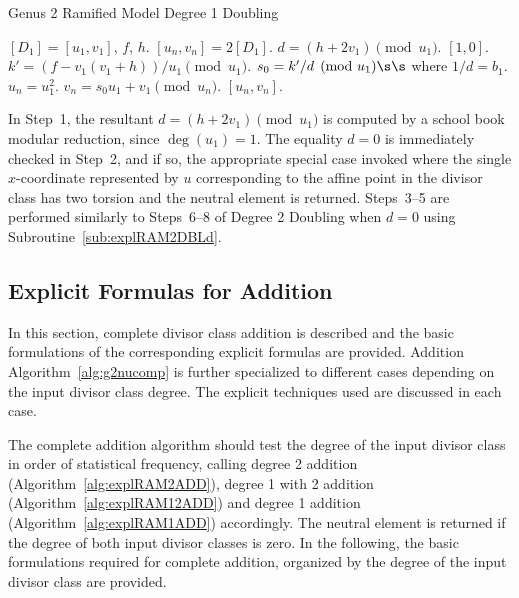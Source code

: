 \begin{algorithm}[htbp]
\caption{Genus 2 Ramified Model Degree 1 Doubling\label{alg:explRAM1DBL}}
\begin{algorithmic} [1]
\Require $[D_1] = [u_1,v_1]$, $f$, $h$.  \smallskip
\Ensure $[u_n,v_n] = 2[D_1]$.
\algrule
\State $d = (h + 2v_1) \pmod{u_1}$.
 \Return $[1,0]$.
\EndIf
\State $k' = (f - v_1(v_1 + h))/u_1 \pmod{u_1}$.
\State $s_0 = k'/d \pmod{u_1} \s\s$ where $1/d = b_1$.
\State $u_n = u_1^2$.
\State $v_n = s_0u_1 + v_1  \pmod{u_n}.$
\State \Return $[u_n,v_n]$.
\end{algorithmic}
\end{algorithm}

In Step~1, the resultant $d = (h + 2v_1) \pmod{u_1}$ is computed by a school
book modular reduction, since $\deg(u_1) = 1$. The equality $d = 0$ is
immediately checked in Step~2, and if so, the appropriate special case invoked
where the single $x$-coordinate represented by $u$ corresponding to the affine
point in the divisor class has two torsion and the neutral element is returned.
Steps~3--5 are performed similarly to Steps~6--8 of Degree 2 Doubling when $d=0$ using
Subroutine~\ref{sub:explRAM2DBLd}.


\subsection{Explicit Formulas for Addition}\label{sec:g2RAMADD}
In this section, complete divisor class addition is described and the basic
formulations of the corresponding explicit formulas are provided. Addition
Algorithm~\ref{alg:g2nucomp} is further specialized to different cases
depending on the input divisor class degree. The explicit techniques used are
discussed in each case. 

The complete addition algorithm should test the degree of the input divisor
class in order of statistical frequency, calling degree 2 addition
(Algorithm~\ref{alg:explRAM2ADD}), degree 1 with 2 addition
(Algorithm~\ref{alg:explRAM12ADD}) and degree 1 addition
(Algorithm~\ref{alg:explRAM1ADD}) accordingly. The neutral element is returned
if the degree of both input divisor classes is zero.  In the following, the
basic formulations required for complete addition, organized by the degree of
the input divisor class are provided.

